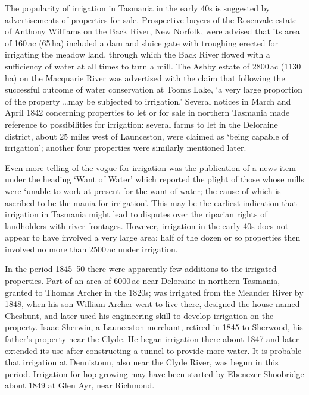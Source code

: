 The popularity of irrigation in Tasmania in the early 40s is suggested
by advertisements of properties for sale.  Prospective buyers of the
Rosenvale estate of Anthony Williams on the Back
River, New Norfolk, were advised that its area of
160\,ac (65\,ha) included a dam and sluice gate with troughing erected
for irrigating the meadow land, through which the Back River flowed
with a sufficiency of water at all times to turn a mill.  The Ashby
estate of 2800\,ac (1130\,ha) on the Macquarie
River was advertised with the claim that
following the successful outcome of water conservation at Tooms
Lake, `a very large proportion of the property
\ldots may be subjected to irrigation.'  Several notices in March and
April 1842 concerning properties to let or for sale in northern
Tasmania made reference to possibilities for irrigation: several farms
to let in the Deloraine district, about 25 miles west
of Launceston, were claimed as `being capable of irrigation'; another
four properties were similarly mentioned later.

Even more telling of the vogue for irrigation was the publication of a
news item under the heading `Want of Water' which reported the plight
of those whose mills were `unable to work at present for the want of
water; the cause of which is ascribed to be the mania for
irrigation'.  This may
be the earliest indication that irrigation in Tasmania might lead to
disputes over the riparian rights of landholders with river frontages.
However, irrigation in the early 40s does not appear to have involved
a very large area: half of the dozen or so properties then involved no
more than 2500\,ac under irrigation.

In the period 1845--50 there were apparently few additions to the
irrigated properties.  Part of an area of 6000\,ac near Deloraine in
northern Tasmania, granted to Thomas Archer in the
1820s; was irrigated from the Meander River by
1848, when his son William Archer went to live
there, designed the house named Ches\-hunt, and later used his
engineering skill to develop irrigation on the property.  Isaac
Sherwin, a Launceston merchant, retired in 1845 to
Sherwood, his father's property near the Clyde.  He began irrigation
there about 1847 and later extended its use after constructing a
tunnel to provide more water.  It is probable that irrigation at
Dennistoun, also near the Clyde River,
 was begun in
this period.  Irrigation for hop-growing may have been
started by Ebenezer Shoobridge about 1849 at
Glen Ayr, near Richmond.

